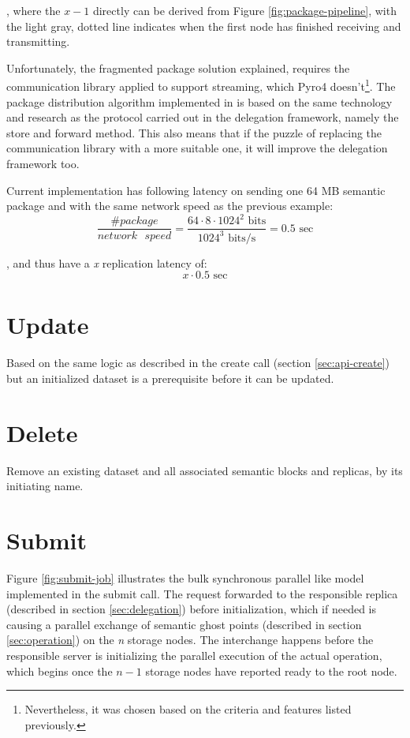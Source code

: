 , where the $x - 1$ directly can be derived from Figure \ref{fig:package-pipeline}, with the light gray, dotted line indicates when the first node has finished receiving and transmitting.
\newline

\noindent
Unfortunately, the fragmented package solution explained, requires the communication library applied to support streaming, which Pyro4 doesn't\footnote{Nevertheless, it was chosen based on the criteria and features listed previously.}. The package distribution algorithm implemented in \CodeName is based on the same technology and research as the protocol carried out in the delegation framework, namely the store and forward method. This also means that if the puzzle of replacing the communication library with a more suitable one, it will improve the delegation framework too.
\newline

Current implementation has following latency on sending one 64 MB semantic package and with the same network speed as the previous example:
\vspace*{1mm}
\begin{equation}
	\dfrac{\texttt{\#}package}{network\text{ }speed} = \dfrac{64\cdot 8\cdot 1024^2 \text{ bits}}{1024^3 \text{ bits/s}} = 0.5 \text{ sec}
\end{equation}
\vspace*{2mm}

\noindent
, and thus have a \textit{x} replication latency of:
\begin{equation}
	x \cdot 0.5 \text{ sec}
\end{equation}
 
\section{Update}
Based on the same logic as described in the create call (section \ref{sec:api-create}) but an initialized dataset is a prerequisite before it can be updated.

\section{Delete}
Remove an existing dataset and all associated semantic blocks and replicas, by its 	initiating name.

\section{Submit} \label{sec:submit}
Figure \ref{fig:submit-job} illustrates the bulk synchronous parallel like model implemented in the submit call. The request forwarded to the responsible replica (described in section \ref{sec:delegation}) before initialization, which if needed is causing a parallel exchange of semantic ghost points (described in section \ref{sec:operation}) on the \textit{n} storage nodes. The interchange happens before the responsible server is initializing the parallel execution of the actual operation, which begins once the $n-1$ storage nodes have reported ready to the root node.
\newline

